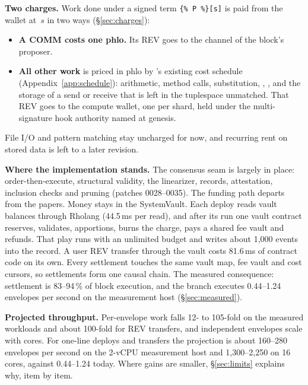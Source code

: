\documentclass[11pt]{article}
\newcommand{\code}{\path}
\newcommand{\signed}[2]{\texttt{\{\%\,#1\,\%\}[#2]}}
\begin{document}
\textbf{Two charges.} Work done under a signed term \signed{P}{s} is paid from the wallet at~$s$ in two ways (\S\ref{sec:charges}):
\begin{itemize}
\item \textbf{A COMM costs one phlo.} Its \code{phloPrice} REV goes to the channel of the block's proposer.
\item \textbf{All other work} is priced in phlo by \code{dev}'s existing cost schedule (Appendix~\ref{app:schedule}): arithmetic, method calls, substitution, \code{new}, \code{match}, and the storage of a send or receive that is left in the tuplespace unmatched. That REV goes to the compute wallet, one per shard, held under the multi-signature hook authority named at genesis.
\end{itemize}
File I/O and pattern matching stay uncharged for now, and recurring rent on stored data is left to a later revision.

\textbf{Where the implementation stands.} The consensus seam is largely in place: order-then-execute, structural validity, the linearizer, records, attestation, inclusion checks and pruning (patches 0028--0035). The funding path departs from the papers. Money stays in the SystemVault. Each deploy reads vault balances through Rholang (44.5\,ms per read), and after its run one vault contract reserves, validates, apportions, burns the charge, pays a shared fee vault and refunds. That play runs with an unlimited budget and writes about 1{,}000 events into the record. A user REV transfer through the vault costs 81.6\,ms of contract code on its own. Every settlement touches the same vault map, fee vault and cost cursors, so settlements form one causal chain. The measured consequence: settlement is 83--94\,\% of block execution, and the branch executes 0.44--1.24 envelopes per second on the measurement host (\S\ref{sec:measured}).

\textbf{Projected throughput.} Per-envelope work falls 12- to 105-fold on the measured workloads and about 100-fold for REV transfers, and independent envelopes scale with cores. For one-line deploys and transfers the projection is about 160--280 envelopes per second on the 2-vCPU measurement host and 1{,}300--2{,}250 on 16 cores, against 0.44--1.24 today. Where gains are smaller, \S\ref{sec:limits} explains why, item by item.
\end{document}
